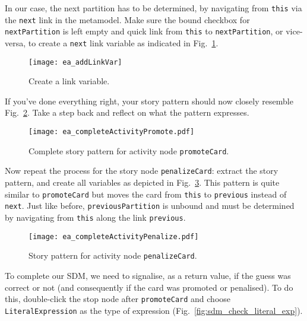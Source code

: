 In our case, the next partition has to be determined, by navigating from \texttt{this} via the \texttt{next} link in the metamodel.  Make sure the bound
checkbox for \texttt{nextPartition} is left empty and quick link from \texttt{this} to \texttt{nextPartition}, or vice-versa, to create a \texttt{next} link
variable as indicated in Fig.~\ref{fig:sdm_check_link_variable}.

\begin{figure}[htbp]
\begin{center}
  \texttt{[image: ea\_addLinkVar]}
  \caption{Create a link variable.}
  \label{fig:sdm_check_link_variable}
\end{center}
\end{figure}

If you've done everything right, your story pattern should now closely resemble Fig.~\ref{fig:sdm_check_complete_activity_node}.  Take a step back and reflect
on what the pattern expresses.

\begin{figure}[htbp]
\begin{center}
  \texttt{[image: ea\_completeActivityPromote.pdf]}
  \caption{Complete story pattern for activity node \texttt{promoteCard}.}
  \label{fig:sdm_check_complete_activity_node}
\end{center}
\end{figure}

Now repeat the process for the story node \texttt{penalizeCard}: extract the story pattern, and create all variables as depicted in
Fig.~\ref{fig:sdm_check_complete_penalize}.  This pattern is quite similar to \texttt{promoteCard} but moves the card from \texttt{this} to \texttt{previous}
instead of \texttt{next}.  Just like before, \texttt{previousPartition} is unbound and must be determined by navigating from \texttt{this} along the link
\texttt{previous}.

\begin{figure}[htbp]
\begin{center}
  \texttt{[image: ea\_completeActivityPenalize.pdf]}
  \caption{Story pattern for activity node \texttt{penalizeCard}.}
  \label{fig:sdm_check_complete_penalize}
\end{center}
\end{figure}

To complete our SDM, we need to signalise, as a return value, if the guess was correct or not (and consequently if the card was promoted or penalised).  To do
 this, double-click the stop node after \texttt{promoteCard} and choose \texttt{LiteralExpression} as the type of expression
(Fig.~\ref{fig:sdm_check_literal_exp}).

